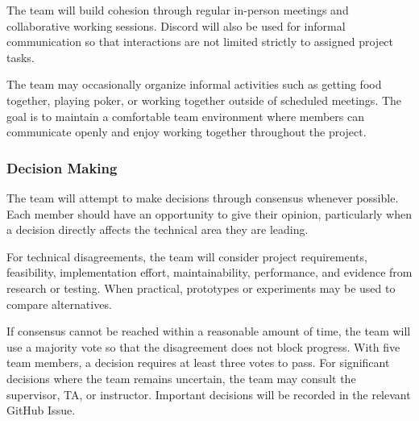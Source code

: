 \documentclass{article}
\begin{document}
The team will build cohesion through regular in-person meetings and collaborative working sessions. Discord will also be used for informal communication so that interactions are not limited strictly to assigned project tasks.

The team may occasionally organize informal activities such as getting food together, playing poker, or working together outside of scheduled meetings. The goal is to maintain a comfortable team environment where members can communicate openly and enjoy working together throughout the project.

\subsubsection*{Decision Making} 

The team will attempt to make decisions through consensus whenever possible. Each member should have an opportunity to give their opinion, particularly when a decision directly affects the technical area they are leading.

For technical disagreements, the team will consider project requirements, feasibility, implementation effort, maintainability, performance, and evidence from research or testing. When practical, prototypes or experiments may be used to compare alternatives.

If consensus cannot be reached within a reasonable amount of time, the team will use a majority vote so that the disagreement does not block progress. With five team members, a decision requires at least three votes to pass. For significant decisions where the team remains uncertain, the team may consult the supervisor, TA, or instructor. Important decisions will be recorded in the relevant GitHub Issue.
\end{document}
